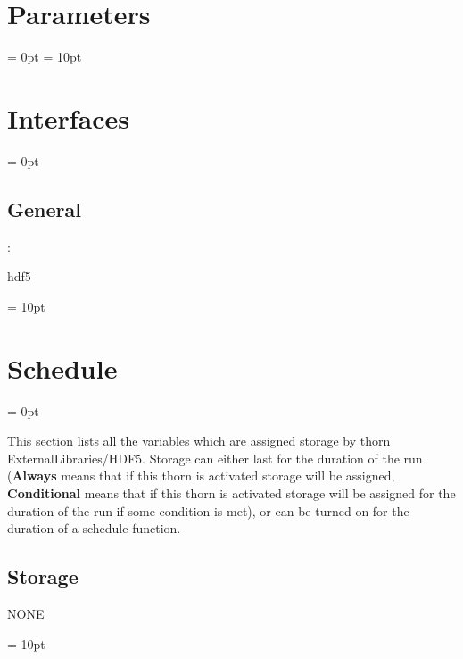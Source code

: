 \documentclass{article}
\begin{document}
\section{Parameters} 


\parskip = 0pt
\parskip = 10pt 

\section{Interfaces} 


\parskip = 0pt

\vspace{3mm} \subsection*{General}

: 

hdf5
\vspace{2mm}

\vspace{5mm}\parskip = 10pt 

\section{Schedule} 


\parskip = 0pt


\noindent This section lists all the variables which are assigned storage by thorn ExternalLibraries/HDF5.  Storage can either last for the duration of the run ({\bf Always} means that if this thorn is activated storage will be assigned, {\bf Conditional} means that if this thorn is activated storage will be assigned for the duration of the run if some condition is met), or can be turned on for the duration of a schedule function.


\subsection*{Storage}NONE

\vspace{5mm}\parskip = 10pt 
\end{document}
